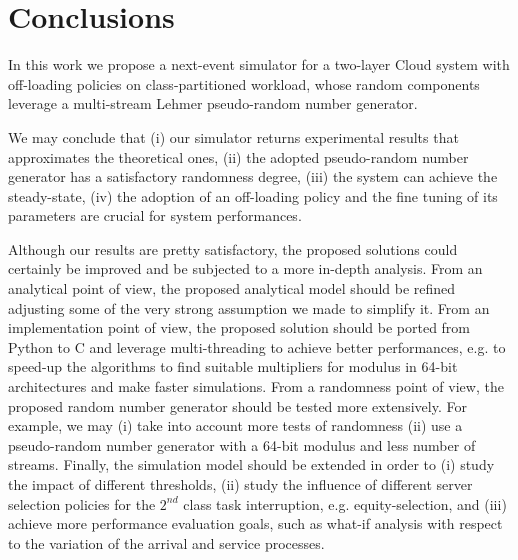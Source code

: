 \section{Conclusions}
\label{sec:conclusions}

In this work we propose a next-event simulator for a two-layer Cloud system with off-loading policies on class-partitioned workload, whose random components leverage a multi-stream Lehmer pseudo-random number generator.

We may conclude that 
(i) our simulator returns experimental results that approximates the theoretical ones, 
(ii) the adopted pseudo-random number generator has a satisfactory randomness degree,
(iii) the system can achieve the steady-state,
(iv) the adoption of an off-loading policy and the fine tuning of its parameters are crucial for system performances.

Although our results are pretty satisfactory, the proposed solutions could certainly be improved and be subjected to a more in-depth analysis.
%
From an analytical point of view, the proposed analytical model should be refined adjusting some of the very strong assumption we made to simplify it.
%
From an implementation point of view, the proposed solution should be ported from Python to C and leverage multi-threading to achieve better performances, e.g. to speed-up the algorithms to find suitable multipliers for modulus in 64-bit architectures and make faster simulations.
%
From a randomness point of view, the proposed random number generator should be tested more extensively. For example, we may (i) take into account more tests of randomness (ii) use a pseudo-random number generator with a 64-bit modulus and less number of streams.
%
Finally, the simulation model should be extended in order to 
(i) study the impact of different thresholds,
(ii) study the influence of different server selection policies for the $2^{nd}$ class task interruption, e.g. equity-selection, and 
(iii) achieve more performance evaluation goals, such as what-if analysis with respect to the variation of the arrival and service processes.
